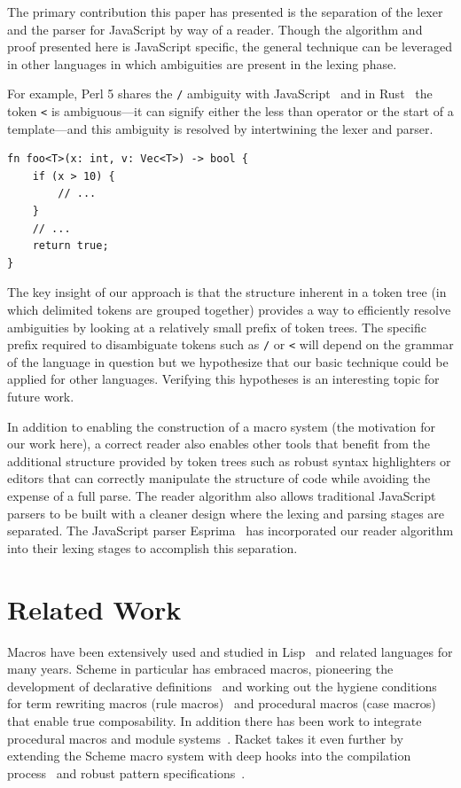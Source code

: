 \documentclass[preprint,10pt]{sigplanconf}
\begin{document}
The primary contribution this paper has presented is the separation of
the lexer and the parser for JavaScript by way of a reader. Though the
algorithm and proof presented here is JavaScript specific, the general
technique can be leveraged in other languages in which ambiguities are
present in the lexing phase.

For example, Perl 5 shares the \lstinline!/! ambiguity with
JavaScript~\cite{parsingperl} and in Rust~\cite{rustlang} the token
\lstinline!<! is ambiguous---it can signify either the less than operator
or the start of a template---and this ambiguity is resolved by
intertwining the lexer and parser.

\begin{lstlisting}
fn foo<T>(x: int, v: Vec<T>) -> bool {
    if (x > 10) {
        // ...
    }
    // ...
    return true;
}
\end{lstlisting}

The key insight of our approach is that the structure inherent in a
token tree (in which delimited tokens are grouped together) provides a
way to efficiently resolve ambiguities by looking at a relatively
small prefix of token trees. The specific prefix required to
disambiguate tokens such as \lstinline!/! or \lstinline!<! will depend
on the grammar of the language in question but we hypothesize that our
basic technique could be applied for other languages.
Verifying this hypotheses is an interesting topic for future work.

In addition to enabling the construction of a macro system (the
motivation for our work here), a correct reader also enables other
tools that benefit from the additional structure provided by token
trees such as robust syntax highlighters or editors that can correctly
manipulate the structure of code while avoiding the expense of a full
parse. The reader algorithm also allows traditional JavaScript parsers
to be built with a cleaner design where the lexing and parsing stages
are separated. The JavaScript parser Esprima~\cite{esprima} has
incorporated our reader algorithm into their lexing stages to
accomplish this separation.


\section{Related Work}
\label{sec:related}

Macros have been extensively used and studied in Lisp~\cite{Foderaro1983,Pitman1980} and related languages for many years. Scheme in particular has embraced macros, pioneering the development of declarative definitions~\cite{Kohlbecker1987} and working out the hygiene conditions for term rewriting macros (rule macros)~\cite{Clinger1991} and procedural macros (case macros)~\cite{Hieb1992} that enable true composability.
In addition there has been work to integrate procedural macros and module systems~\cite{Flatt2002,Ghuloum2007}.
Racket takes it even further by extending the Scheme macro system with deep hooks into the compilation process~\cite{Flatt2012,Tobin-Hochstadt2011} and robust pattern specifications~\cite{Culpepper2010a}.
\end{document}
